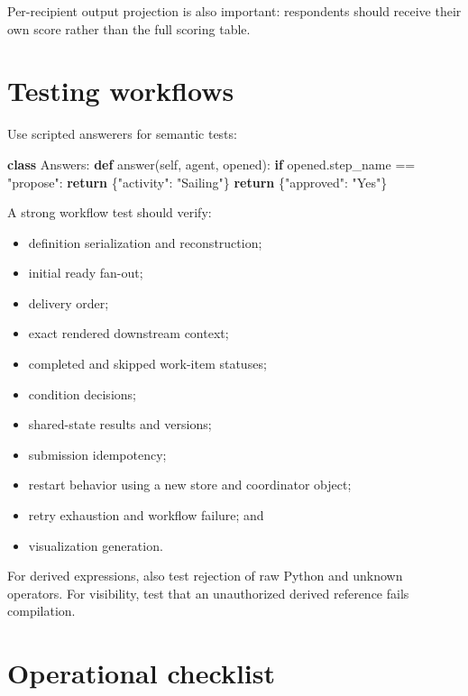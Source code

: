 \documentclass[
  10pt,
]{report}
\newenvironment{Shaded}{}{}
\newcommand{\ControlFlowTok}[1]{\textcolor[rgb]{0.00,0.44,0.13}{\textbf{#1}}}
\newcommand{\KeywordTok}[1]{\textcolor[rgb]{0.00,0.44,0.13}{\textbf{#1}}}
\newcommand{\NormalTok}[1]{#1}
\newcommand{\OperatorTok}[1]{\textcolor[rgb]{0.40,0.40,0.40}{#1}}
\newcommand{\StringTok}[1]{\textcolor[rgb]{0.25,0.44,0.63}{#1}}
\newcommand{\VariableTok}[1]{\textcolor[rgb]{0.10,0.09,0.49}{#1}}
\providecommand{\tightlist}{%
  \setlength{\itemsep}{0pt}\setlength{\parskip}{0pt}}
\begin{document}
Per-recipient output projection is also important: respondents should
receive their own score rather than the full scoring table.

\chapter{Testing workflows}\label{testing-workflows}

Use scripted answerers for semantic tests:

\begin{Shaded}
\begin{Highlighting}[]
\KeywordTok{class}\NormalTok{ Answers:}
    \KeywordTok{def}\NormalTok{ answer(}\VariableTok{self}\NormalTok{, agent, opened):}
        \ControlFlowTok{if}\NormalTok{ opened.step\_name }\OperatorTok{==} \StringTok{"propose"}\NormalTok{:}
            \ControlFlowTok{return}\NormalTok{ \{}\StringTok{"activity"}\NormalTok{: }\StringTok{"Sailing"}\NormalTok{\}}
        \ControlFlowTok{return}\NormalTok{ \{}\StringTok{"approved"}\NormalTok{: }\StringTok{"Yes"}\NormalTok{\}}
\end{Highlighting}
\end{Shaded}

A strong workflow test should verify:

\begin{itemize}
\tightlist
\item
  definition serialization and reconstruction;
\item
  initial ready fan-out;
\item
  delivery order;
\item
  exact rendered downstream context;
\item
  completed and skipped work-item statuses;
\item
  condition decisions;
\item
  shared-state results and versions;
\item
  submission idempotency;
\item
  restart behavior using a new store and coordinator object;
\item
  retry exhaustion and workflow failure; and
\item
  visualization generation.
\end{itemize}

For derived expressions, also test rejection of raw Python and unknown
operators. For visibility, test that an unauthorized derived reference
fails compilation.

\chapter{Operational checklist}\label{operational-checklist}
\end{document}
